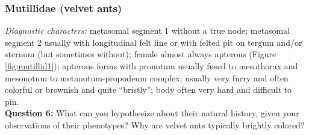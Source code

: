 \documentclass[letterpaper, 11pt]{article}
\begin{document}
\subsubsection{Mutillidae (velvet ants)}
\noindent{}\textit{Diagnostic characters:} metasomal segment 1 without a true node; metasomal segment 2 usually with longitudinal felt line or with felted pit on tergum and/or sternum (but sometimes without); female almost always apterous (Figure \ref{fig:mutillid1}); apterous forms with pronotum usually fused to mesothorax and mesonotum to metanotum-propodeum complex; usually very furry and often colorful or brownish and quite ``bristly''; body often very hard and difficult to pin.\\

\noindent{}\textbf{Question 6:} What can you hypothesize about their natural history, given your observations of their phenotypes? Why are velvet ants typically brightly colored?\\
\end{document}
